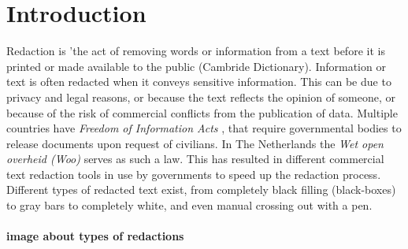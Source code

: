 \chapter{Introduction}

Redaction is 'the act of removing words or information from a text before it is printed or made available to the public (Cambride Dictionary). Information or text is often redacted when it conveys sensitive information. This can be due to privacy and legal reasons, or because the text reflects the opinion of someone, or because of the risk of commercial conflicts from the publication of data. %
Multiple countries have \textit{Freedom of Information Acts} \cite{USAFia}, that require governmental bodies to release documents upon request of civilians. In The Netherlands the \textit{Wet open overheid (Woo)} \cite{WooWebsite} serves as such a law. This has resulted in different commercial text redaction tools in use by governments to speed up the redaction process. Different types of redacted text exist, from completely black filling (black-boxes) to gray bars to completely white, and even manual crossing out with a pen. 
\\\\
\textbf{image about types of redactions}
\\\\

